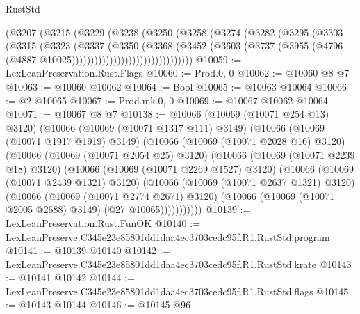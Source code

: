 \begin{lexlean}{RustStd}
\begin{coremodule}
                          (@3207
                            (@3215
                              (@3229
                                (@3238
                                  (@3250
                                    (@3258
                                      (@3274
                                        (@3282
                                          (@3295
                                            (@3303
                                              (@3315
                                                (@3323
                                                  (@3337
                                                    (@3350
                                                      (@3368
                                                        (@3452
                                                          (@3603
                                                            (@3737
                                                              (@3955
                                                                (@4796
                                                                  (@4887
                                                                    @10025))))))))))))))))))))))))))))))))
@10059 := LexLeanPreservation.Rust.Flags
@10060 := Prod.{0, 0}
@10062 := @10060 @8 @7
@10063 := @10060 @10062
@10064 := Bool
@10065 := @10063 @10064
@10066 := @2 @10065
@10067 := Prod.mk.{0, 0}
@10069 := @10067 @10062 @10064
@10071 := @10067 @8 @7
@10138 := @10066
    (@10069 (@10071 @254 @13) @3120)
    (@10066
      (@10069 (@10071 @1317 @111) @3149)
      (@10066
        (@10069 (@10071 @1917 @1919) @3149)
        (@10066
          (@10069 (@10071 @2028 @16) @3120)
          (@10066
            (@10069 (@10071 @2054 @25) @3120)
            (@10066
              (@10069 (@10071 @2239 @18) @3120)
              (@10066
                (@10069 (@10071 @2269 @1527) @3120)
                (@10066
                  (@10069 (@10071 @2439 @1321) @3120)
                  (@10066
                    (@10069 (@10071 @2637 @1321) @3120)
                    (@10066
                      (@10069 (@10071 @2774 @2671) @3120)
                      (@10066 (@10069 (@10071 @2005 @2688) @3149) (@27 @10065)))))))))))
@10139 := LexLeanPreservation.Rust.FunOK
@10140 := LexLeanPreserve.C345e23e85801dd1daa4ec3703cedc95f.R1.RustStd.program
@10141 := @10139 @10140
@10142 := LexLeanPreserve.C345e23e85801dd1daa4ec3703cedc95f.R1.RustStd.krate
@10143 := @10141 @10142
@10144 := LexLeanPreserve.C345e23e85801dd1daa4ec3703cedc95f.R1.RustStd.flags
@10145 := @10143 @10144
@10146 := @10145 @96

\end{coremodule}
\end{lexlean}
